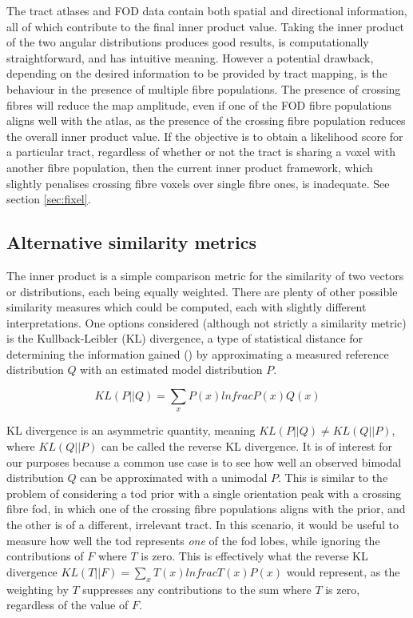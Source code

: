 The tract atlases and FOD data contain both spatial and directional information, all of which contribute to the final inner product value.
Taking the inner product of the two angular distributions produces good results, is computationally straightforward, and has intuitive meaning.
However a potential drawback, depending on the desired information to be provided by tract mapping, is the behaviour in the presence of multiple fibre populations.
The presence of crossing fibres will reduce the map amplitude, even if one of the FOD fibre populations aligns well with the atlas, as the presence of the crossing fibre population reduces the overall inner product value.
If the objective is to obtain a likelihood score for a particular tract, regardless of whether or not the tract is sharing a voxel with another fibre population, then the current inner product framework, which slightly penalises crossing fibre voxels over single fibre ones, is inadequate. 
See section \ref{sec:fixel}.

\subsection{Alternative similarity metrics}

The inner product is a simple comparison metric for the similarity of two vectors or distributions, each being equally weighted.
There are plenty of other possible similarity measures which could be computed, each with slightly different interpretations.
One options considered (although not strictly a similarity metric) is the Kullback-Leibler (KL) divergence, a type of statistical distance for determining the information gained () by approximating a measured reference distribution $Q$ with an estimated model distribution $P$.

\begin{equation}
  KL(P||Q) = \sum_x P(x) ln frac{P(x)}{Q(x)} \label{eq:kl}
\end{equation}

KL divergence is an asymmetric quantity, meaning $KL(P||Q) \neq KL(Q||P)$, where $KL(Q||P)$ can be called the reverse KL divergence.
It is of interest for our purposes because a common  use case is to see how well an observed bimodal distribution $Q$ can be approximated with a unimodal $P$.
This is similar to the problem of considering a \gls{tod} prior with a single orientation peak with a crossing fibre \gls{fod}, in which one of the crossing fibre populations aligns with the prior, and the other is of a different, irrelevant tract.
In this scenario, it would be useful to measure how well the \gls{tod} represents \textit{one} of the \gls{fod} lobes, while ignoring the contributions of $F$ where $T$ is zero.
This is effectively what the reverse KL divergence $KL(T||F) = \sum_x T(x) ln frac{T(x)}{P(x)}$ would represent, as the weighting by $T$ suppresses any contributions to the sum where $T$ is zero, regardless of the value of $F$.

